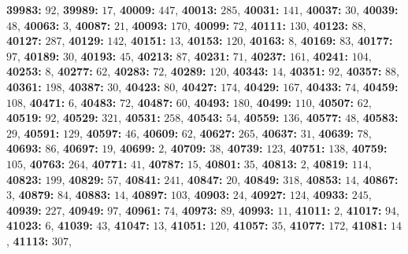 \textsf{\bfseries 39983:} $92$, \textsf{\bfseries 39989:} $17$, \textsf{\bfseries 40009:} $447$, \textsf{\bfseries 40013:} $285$, \textsf{\bfseries 40031:} $141$, \textsf{\bfseries 40037:} $30$, \textsf{\bfseries 40039:} $48$, \textsf{\bfseries 40063:} $3$, \textsf{\bfseries 40087:} $21$, \textsf{\bfseries 40093:} $170$, \textsf{\bfseries 40099:} $72$, \textsf{\bfseries 40111:} $130$, \textsf{\bfseries 40123:} $88$, \textsf{\bfseries 40127:} $287$, \textsf{\bfseries 40129:} $142$, \textsf{\bfseries 40151:} $13$, \textsf{\bfseries 40153:} $120$, \textsf{\bfseries 40163:} $8$, \textsf{\bfseries 40169:} $83$, \textsf{\bfseries 40177:} $97$, \textsf{\bfseries 40189:} $30$, \textsf{\bfseries 40193:} $45$, \textsf{\bfseries 40213:} $87$, \textsf{\bfseries 40231:} $71$, \textsf{\bfseries 40237:} $161$, \textsf{\bfseries 40241:} $104$, \textsf{\bfseries 40253:} $8$, \textsf{\bfseries 40277:} $62$, \textsf{\bfseries 40283:} $72$, \textsf{\bfseries 40289:} $120$, \textsf{\bfseries 40343:} $14$, \textsf{\bfseries 40351:} $92$, \textsf{\bfseries 40357:} $88$, \textsf{\bfseries 40361:} $198$, \textsf{\bfseries 40387:} $30$, \textsf{\bfseries 40423:} $80$, \textsf{\bfseries 40427:} $174$, \textsf{\bfseries 40429:} $167$, \textsf{\bfseries 40433:} $74$, \textsf{\bfseries 40459:} $108$, \textsf{\bfseries 40471:} $6$, \textsf{\bfseries 40483:} $72$, \textsf{\bfseries 40487:} $60$, \textsf{\bfseries 40493:} $180$, \textsf{\bfseries 40499:} $110$, \textsf{\bfseries 40507:} $62$, \textsf{\bfseries 40519:} $92$, \textsf{\bfseries 40529:} $321$, \textsf{\bfseries 40531:} $258$, \textsf{\bfseries 40543:} $54$, \textsf{\bfseries 40559:} $136$, \textsf{\bfseries 40577:} $48$, \textsf{\bfseries 40583:} $29$, \textsf{\bfseries 40591:} $129$, \textsf{\bfseries 40597:} $46$, \textsf{\bfseries 40609:} $62$, \textsf{\bfseries 40627:} $265$, \textsf{\bfseries 40637:} $31$, \textsf{\bfseries 40639:} $78$, \textsf{\bfseries 40693:} $86$, \textsf{\bfseries 40697:} $19$, \textsf{\bfseries 40699:} $2$, \textsf{\bfseries 40709:} $38$, \textsf{\bfseries 40739:} $123$, \textsf{\bfseries 40751:} $138$, \textsf{\bfseries 40759:} $105$, \textsf{\bfseries 40763:} $264$, \textsf{\bfseries 40771:} $41$, \textsf{\bfseries 40787:} $15$, \textsf{\bfseries 40801:} $35$, \textsf{\bfseries 40813:} $2$, \textsf{\bfseries 40819:} $114$, \textsf{\bfseries 40823:} $199$, \textsf{\bfseries 40829:} $57$, \textsf{\bfseries 40841:} $241$, \textsf{\bfseries 40847:} $20$, \textsf{\bfseries 40849:} $318$, \textsf{\bfseries 40853:} $14$, \textsf{\bfseries 40867:} $3$, \textsf{\bfseries 40879:} $84$, \textsf{\bfseries 40883:} $14$, \textsf{\bfseries 40897:} $103$, \textsf{\bfseries 40903:} $24$, \textsf{\bfseries 40927:} $124$, \textsf{\bfseries 40933:} $245$, \textsf{\bfseries 40939:} $227$, \textsf{\bfseries 40949:} $97$, \textsf{\bfseries 40961:} $74$, \textsf{\bfseries 40973:} $89$, \textsf{\bfseries 40993:} $11$, \textsf{\bfseries 41011:} $2$, \textsf{\bfseries 41017:} $94$, \textsf{\bfseries 41023:} $6$, \textsf{\bfseries 41039:} $43$, \textsf{\bfseries 41047:} $13$, \textsf{\bfseries 41051:} $120$, \textsf{\bfseries 41057:} $35$, \textsf{\bfseries 41077:} $172$, \textsf{\bfseries 41081:} $14$, \textsf{\bfseries 41113:} $307$, 
